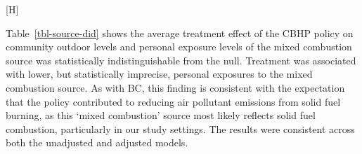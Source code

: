 \documentclass[
  letterpaper,
  DIV=11,
  numbers=noendperiod]{scrartcl}
\makeatletter
\renewenvironment{figure}%
   {\renewcommand\familydefault\sfdefault
    \@float{figure}}
   {\end@float}
\providecommand{\DIFaddbeginFL}{} %
\providecommand{\DIFaddendFL}{} %
\providecommand{\DIFdelbeginFL}{} %
\providecommand{\DIFdelendFL}{} %
\newcommand{\DIFscaledelfig}{0.5}
\newlength{\DIFdelgraphicswidth} %
\newlength{\DIFdelgraphicsheight} %
\newcommand{\DIFaddincludegraphics}[2][]{{\color{blue}\fbox{\DIFOincludegraphics[#1]{#2}}}} %
\newcommand{\DIFdelincludegraphics}[2][]{%
\sbox{\DIFdelgraphicsbox}{\DIFOincludegraphics[#1]{#2}}%
\settoboxwidth{\DIFdelgraphicswidth}{\DIFdelgraphicsbox} %
\settoboxtotalheight{\DIFdelgraphicsheight}{\DIFdelgraphicsbox} %
\scalebox{\DIFscaledelfig}{%
\parbox[b]{\DIFdelgraphicswidth}{\usebox{\DIFdelgraphicsbox}\\[-\baselineskip] \rule{\DIFdelgraphicswidth}{0em}}\llap{\resizebox{\DIFdelgraphicswidth}{\DIFdelgraphicsheight}{%
\setlength{\unitlength}{\DIFdelgraphicswidth}%
\begin{picture}(1,1)%
\thicklines\linethickness{2pt} %
{\color[rgb]{1,0,0}\put(0,0){\framebox(1,1){}}}%
{\color[rgb]{1,0,0}\put(0,0){\line( 1,1){1}}}%
{\color[rgb]{1,0,0}\put(0,1){\line(1,-1){1}}}%
\end{picture}%
}\hspace*{3pt}}} %
} %
\DeclareRobustCommand{\DIFaddbeginFL}{\DIFOaddbeginFL \let\includegraphics\DIFaddincludegraphics} %
\DeclareRobustCommand{\DIFaddendFL}{\DIFOaddendFL \let\includegraphics\DIFOincludegraphics} %
\DeclareRobustCommand{\DIFdelbeginFL}{\DIFOdelbeginFL \let\includegraphics\DIFdelincludegraphics} %
\DeclareRobustCommand{\DIFdelendFL}{\DIFOaddendFL \let\includegraphics\DIFOincludegraphics} %
\makeatother
\begin{document}
\begin{figure}[H]

\DIFdelbeginFL %
\DIFdelendFL \DIFaddbeginFL {}
\DIFaddendFL 

\DIFdelbeginFL %

\DIFdelendFL \caption{\label{fig-source-season}Arithmetic mean dispersion normalized
source contributions found from the 4-factor PMF solution for \textbf{A}
outdoor and \textbf{B} personal PM\textsubscript{2.5} exposure samples
by year the group received treatment.}

\end{figure}%

Table~\ref{tbl-source-did} shows the average treatment effect of the
CBHP policy on community outdoor levels and personal exposure levels of
the mixed combustion source was statistically indistinguishable from the
null. Treatment was associated with lower, but statistically imprecise,
personal exposures to the mixed combustion source. As with BC, this
finding is consistent with the expectation that the policy contributed
to reducing air pollutant emissions from solid fuel burning, as this
`mixed combustion' source most likely reflects solid fuel combustion,
particularly in our study settings. The results were consistent across
both the unadjusted and adjusted models.
\end{document}

